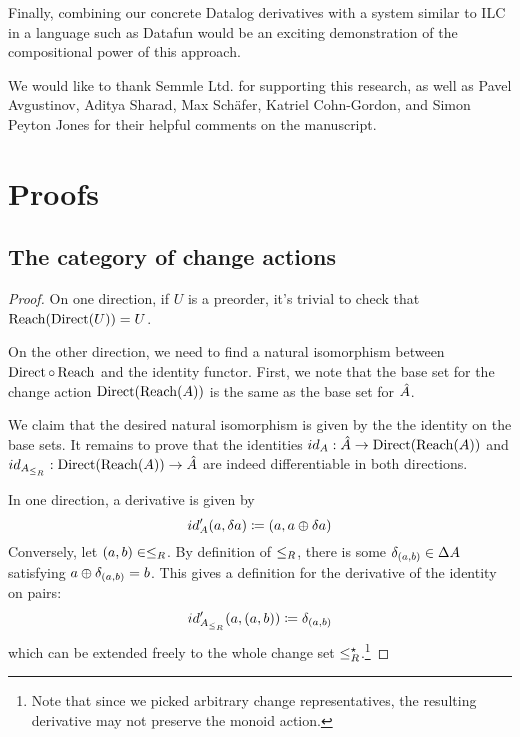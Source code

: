 Finally, combining our concrete Datalog derivatives with a system similar to ILC
in a language such as Datafun would be an exciting demonstration of the compositional
power of this approach.

\begin{acks}

We would like to thank Semmle Ltd. for supporting this research, as well as Pavel
Avgustinov, Aditya Sharad, Max Sch\"afer, Katriel Cohn-Gordon, and Simon Peyton Jones for their
helpful comments on the manuscript.

\end{acks}

\printbibliography

\clearpage
\appendix
\appendixpage
\section{Proofs}

\subsection{The category of change actions}

\preordEquivalence*
\begin{proof}
  \label{prf:preordEquivalence}
  On one direction, if $U$ is a preorder, it's trivial to check that $\operatorname{Reach} (\operatorname{Direct} (U)) = U$.

  On the other direction, we need to find a natural isomorphism between $\operatorname{Direct} \circ \operatorname{Reach}$
  and the identity functor. First, we note that the base set for the change action
  $\operatorname{Direct}(\operatorname{Reach}(A))$ is the same as the base set for $\hat{A}$.

  We claim that the desired natural isomorphism is given by the
  the identity on the base sets. It remains to prove that the identities
  $id_A : \hat{A} \rightarrow \operatorname{Direct}(\operatorname{Reach}(A))$ and
  $id_{A_{\leq_R}} : \operatorname{Direct}(\operatorname{Reach}(A)) \rightarrow \hat{A}$
  are indeed differentiable in both directions.

  In one direction, a derivative is given by
  \begin{displaymath}
    id'_A(a, \delta a) \coloneqq (a, a \oplus \delta a)
  \end{displaymath}
  Conversely, let $(a, b) \in \leq_R$. By definition of $\leq_R$, there is some
  $\delta_{(a, b)} \in \Delta A$ satisfying $a \oplus \delta_{(a,b)} = b$.
  This gives a definition for the derivative of the identity on pairs:
  \begin{displaymath}
    id'_{A_{\leq_R}}(a, (a, b)) \coloneqq \delta_{(a, b)}
  \end{displaymath}
  which can be extended freely to the whole change set
  $\leq_R^\star$.\footnote{Note that since we picked arbitrary change
    representatives, the resulting derivative may not preserve the monoid action.}
\end{proof}

